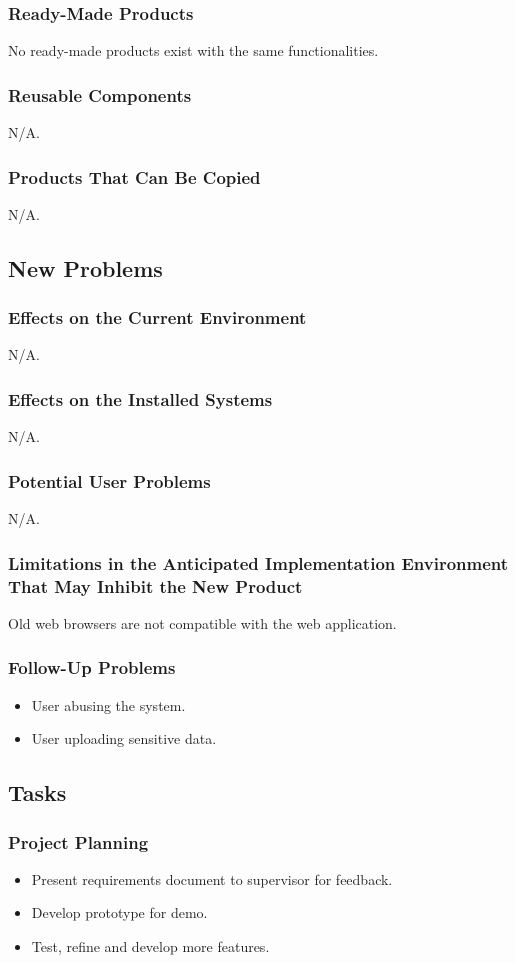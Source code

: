 \documentclass[12pt]{article}
\begin{document}
{{{{{{{\subsubsection{Ready-Made Products}
No ready-made products exist with the same functionalities. 
\subsubsection{Reusable Components}
N/A.
\subsubsection{Products That Can Be Copied}
N/A.
\subsection{New Problems}
\subsubsection{Effects on the Current Environment}
N/A.
\subsubsection{Effects on the Installed Systems}
N/A.
\subsubsection{Potential User Problems}
N/A.
\subsubsection{Limitations in the Anticipated Implementation Environment That 
May Inhibit the New Product}
Old web browsers are not compatible with the web application.
\subsubsection{Follow-Up Problems}
\begin{itemize}
  \item User abusing the system.
  \item User uploading sensitive data.
\end{itemize}

\subsection{Tasks}
\subsubsection{Project Planning}
\begin{itemize}
  \item Present requirements document to supervisor for feedback.
  \item Develop prototype for demo.
  \item Test, refine and develop more features.
\end{itemize}
}}}}}}}
\end{document}
